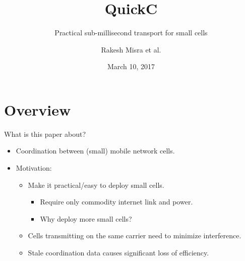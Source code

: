 \documentclass[xcolor=pdftex,dvipsnames,table]{beamer}
\title{QuickC}
\subtitle{Practical sub-millisecond transport for small cells}
\author{Rakesh Misra et al.}
\institute{Stanford University}
\date{March 10, 2017}
\begin{document}
\begin{frame}
\titlepage
\end{frame}

\section{Overview}

\begin{frame}{What is this paper about?}
  \begin{itemize}
  \item Coordination between (small) mobile network cells.
  \item Motivation:
    \begin{itemize}
    \item Make it practical/easy to deploy small cells.
      \begin{itemize}
      \item Require only commodity internet link and power.
      \item Why deploy more small cells?
      \end{itemize}
    \item Cells transmitting on the same carrier need to minimize interference.
    \item Stale coordination data causes significant loss of efficiency.
    \end{itemize}
  \end{itemize}
\end{frame}


\end{document}
